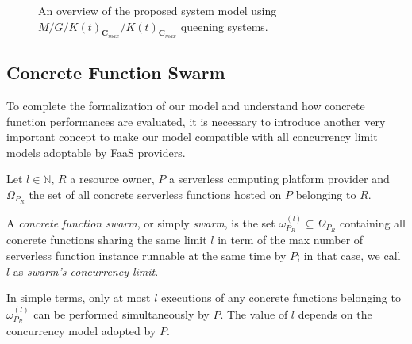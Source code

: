 \documentclass[12pt,a4paper]{report}
\newcommand{\N}{\mathbb{N}}
\begin{document}
\begin{figure}[h!]
	\caption{An overview of the proposed system model using $M/G/K(t)_{\textbf{C}_{max}}/K(t)_{\textbf{C}_{max}}$ queening systems.}
\end{figure}

\subsection{Concrete Function Swarm}

To complete the formalization of our model and understand how concrete function performances are evaluated, it is necessary to introduce another very important concept to make our model compatible with all concurrency limit models adoptable by FaaS providers.

Let $l \in \N$, $R$ a resource owner, $P$ a serverless computing platform provider and $\Omega_{P_R}$ the set of all concrete serverless functions hosted on $P$ belonging to $R$.

A \textit{concrete function swarm}, or simply \textit{swarm}, is the set $\omega_{P_R}^{(l)} \subseteq \Omega_{P_R}$ containing all concrete functions sharing the same limit $l$ in term of the max number of serverless function instance runnable at the same time by $P$; in that case, we call $l$ as \textit{swarm's concurrency limit}.

In simple terms, only at most $l$ executions of any concrete functions belonging to $\omega_{P_R}^{(l)}$ can be performed simultaneously by $P$. The value of $l$ depends on the concurrency model adopted by $P$. 
\end{document}
